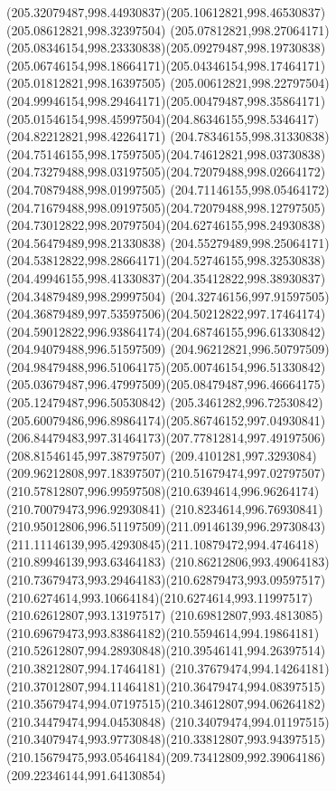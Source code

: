 {{  \curveto(205.32079487,998.44930837)(205.10612821,998.46530837)(205.08612821,998.32397504)
  \curveto(205.07812821,998.27064171)(205.08346154,998.23330838)(205.09279487,998.19730838)
  \curveto(205.06746154,998.18664171)(205.04346154,998.17464171)(205.01812821,998.16397505)
  \curveto(205.00612821,998.22797504)(204.99946154,998.29464171)(205.00479487,998.35864171)
  \curveto(205.01546154,998.45997504)(204.86346155,998.5346417)(204.82212821,998.42264171)
  \curveto(204.78346155,998.31330838)(204.75146155,998.17597505)(204.74612821,998.03730838)
  \curveto(204.73279488,998.03197505)(204.72079488,998.02664172)(204.70879488,998.01997505)
  \curveto(204.71146155,998.05464172)(204.71679488,998.09197505)(204.72079488,998.12797505)
  \curveto(204.73012822,998.20797504)(204.62746155,998.24930838)(204.56479489,998.21330838)
  \curveto(204.55279489,998.25064171)(204.53812822,998.28664171)(204.52746155,998.32530838)
  \curveto(204.49946155,998.41330837)(204.35412822,998.38930837)(204.34879489,998.29997504)
  \curveto(204.32746156,997.91597505)(204.36879489,997.53597506)(204.50212822,997.17464174)
  \curveto(204.59012822,996.93864174)(204.68746155,996.61330842)(204.94079488,996.51597509)
  \curveto(204.96212821,996.50797509)(204.98479488,996.51064175)(205.00746154,996.51330842)
  \curveto(205.03679487,996.47997509)(205.08479487,996.46664175)(205.12479487,996.50530842)
  \curveto(205.3461282,996.72530842)(205.60079486,996.89864174)(205.86746152,997.04930841)
  \curveto(206.84479483,997.31464173)(207.77812814,997.49197506)(208.81546145,997.38797507)
  \curveto(209.4101281,997.3293084)(209.96212808,997.18397507)(210.51679474,997.02797507)
  \curveto(210.57812807,996.99597508)(210.6394614,996.96264174)(210.70079473,996.92930841)
  \curveto(210.8234614,996.76930841)(210.95012806,996.51197509)(211.09146139,996.29730843)
  \curveto(211.11146139,995.42930845)(211.10879472,994.4746418)(210.89946139,993.63464183)
  \curveto(210.86212806,993.49064183)(210.73679473,993.29464183)(210.62879473,993.09597517)
  \curveto(210.6274614,993.10664184)(210.6274614,993.11997517)(210.62612807,993.13197517)
  \curveto(210.69812807,993.4813085)(210.69679473,993.83864182)(210.5594614,994.19864181)
  \curveto(210.52612807,994.28930848)(210.39546141,994.26397514)(210.38212807,994.17464181)
  \curveto(210.37679474,994.14264181)(210.37012807,994.11464181)(210.36479474,994.08397515)
  \curveto(210.35679474,994.07197515)(210.34612807,994.06264182)(210.34479474,994.04530848)
  \curveto(210.34079474,994.01197515)(210.34079474,993.97730848)(210.33812807,993.94397515)
  \curveto(210.15679475,993.05464184)(209.73412809,992.39064186)(209.22346144,991.64130854)
}}
